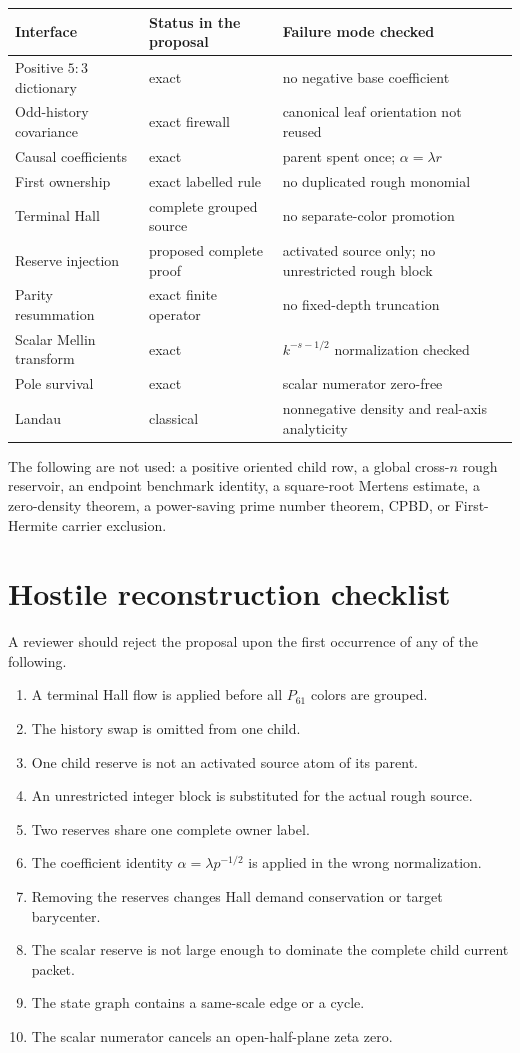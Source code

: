 \documentclass[11pt]{article}
\newcommand{\1}{\mathbf 1}
\begin{document}
\begin{longtable}{p{}p{}p{}}
\toprule
Interface & Status in the proposal & Failure mode checked\\
\midrule
Positive $5{:}3$ dictionary & exact & no negative base coefficient\\
Odd-history covariance & exact firewall & canonical leaf orientation not reused\\
Causal coefficients & exact & parent spent once; $\alpha=\lambda r$\\
First ownership & exact labelled rule & no duplicated rough monomial\\
Terminal Hall & complete grouped source & no separate-color promotion\\
Reserve injection & proposed complete proof & activated source only; no unrestricted rough block\\
Parity resummation & exact finite operator & no fixed-depth truncation\\
Scalar Mellin transform & exact & $k^{-s-1/2}$ normalization checked\\
Pole survival & exact & scalar numerator zero-free\\
Landau & classical & nonnegative density and real-axis analyticity\\
\bottomrule
\end{longtable}

The following are not used: a positive oriented child row, a global cross-$n$ rough reservoir, an endpoint benchmark identity, a square-root Mertens estimate, a zero-density theorem, a power-saving prime number theorem, CPBD, or First-Hermite carrier exclusion.

\section{Hostile reconstruction checklist}

A reviewer should reject the proposal upon the first occurrence of any of the following.
\begin{enumerate}
\item A terminal Hall flow is applied before all $P_{61}$ colors are grouped.
\item The history swap is omitted from one child.
\item One child reserve is not an activated source atom of its parent.
\item An unrestricted integer block is substituted for the actual rough source.
\item Two reserves share one complete owner label.
\item The coefficient identity $\alpha=\lambda p^{-1/2}$ is applied in the wrong normalization.
\item Removing the reserves changes Hall demand conservation or target barycenter.
\item The scalar reserve is not large enough to dominate the complete child current packet.
\item The state graph contains a same-scale edge or a cycle.
\item The scalar numerator cancels an open-half-plane zeta zero.
\end{enumerate}
\end{document}
